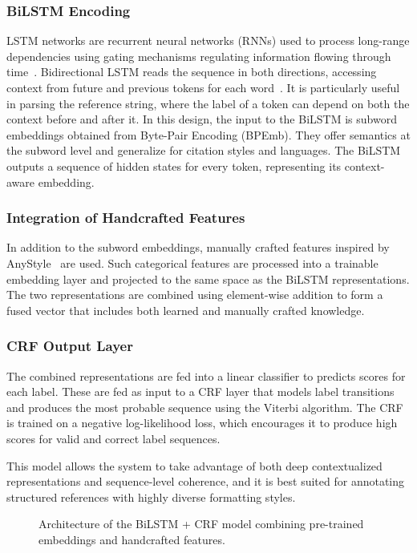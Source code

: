\subsubsection{BiLSTM Encoding}
LSTM networks are recurrent neural networks (RNNs) used to process long-range dependencies using gating mechanisms regulating information flowing through time~\cite{lstm}. Bidirectional LSTM reads the sequence in both directions, accessing context from future and previous tokens for each word~\cite{bilstm}. It is particularly useful in parsing the reference string, where the label of a token can depend on both the context before and after it.
In this design, the input to the BiLSTM is subword embeddings obtained from Byte-Pair Encoding (BPEmb). They offer semantics at the subword level and generalize for citation styles and languages. The BiLSTM outputs a sequence of hidden states for every token, representing its context-aware embedding.

\subsubsection{Integration of Handcrafted Features}
In addition to the subword embeddings, manually crafted features inspired by AnyStyle~\cite{anystyle} are used. Such categorical features are processed into a trainable embedding layer and projected to the same space as the BiLSTM representations. The two representations are combined using element-wise addition to form a fused vector that includes both learned and manually crafted knowledge.

\subsubsection{CRF Output Layer}
The combined representations are fed into a linear classifier to predicts scores for each label. These are fed as input to a CRF layer that models label transitions and produces the most probable sequence using the Viterbi algorithm. The CRF is trained on a negative log-likelihood loss, which encourages it to produce high scores for valid and correct label sequences.

This model allows the system to take advantage of both deep contextualized representations and sequence-level coherence, and it is best suited for annotating structured references with highly diverse formatting styles.

\begin{figure}[ht]
    \centering
    
    \caption[BiLSTM + CRF Model Architecture]{Architecture of the BiLSTM + CRF model combining pre-trained embeddings and handcrafted features.}
    \label{fig:bilstm-crf-architecture}
\end{figure}
